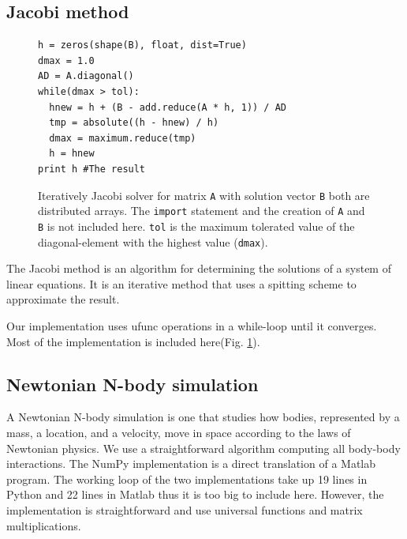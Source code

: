\documentclass[10pt]{article}
\begin{document}
\subsection{Jacobi method}
\begin{figure}
\begin{lstlisting}
h = zeros(shape(B), float, dist=True)
dmax = 1.0
AD = A.diagonal()
while(dmax > tol):
  hnew = h + (B - add.reduce(A * h, 1)) / AD
  tmp = absolute((h - hnew) / h)
  dmax = maximum.reduce(tmp)
  h = hnew
print h #The result
\end{lstlisting}
 \caption{Iteratively Jacobi solver for matrix \texttt{A} with solution vector \texttt{B} both are distributed arrays. The \texttt{import} statement and the creation of \texttt{A} and \texttt{B} is not included here.
 \texttt{tol} is the maximum tolerated value of the diagonal-element with the highest value (\texttt{dmax}).}
 \label{lst:jocobi}
\end{figure}

The Jacobi method is an algorithm for determining the solutions of a system of linear equations. It is an iterative method that uses a spitting scheme to approximate the result.

Our implementation uses ufunc operations in a while-loop until it converges. Most of the implementation is included here(Fig. \ref{lst:jocobi}).



\subsection{Newtonian N-body simulation}
A Newtonian N-body simulation is one that studies how bodies, represented by a mass, a location, and a velocity, move in space according to the laws of Newtonian physics. We use a straightforward algorithm computing all body-body interactions. The NumPy implementation is a direct translation of a Matlab program\cite{assignmentNbody}. The working loop of the two implementations take up 19 lines in Python and 22 lines in Matlab thus it is too big to include here. However, the implementation is straightforward and use universal functions and matrix multiplications.
\end{document}
